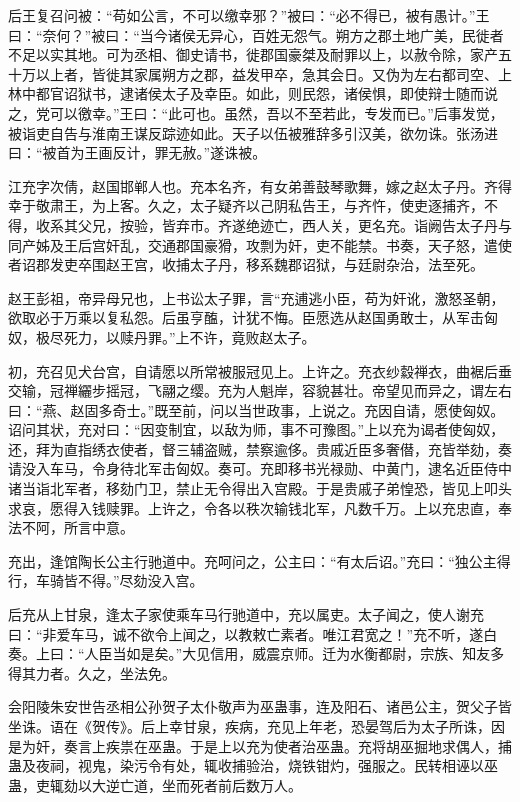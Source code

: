 \documentclass[]{article}
\begin{document}
后王复召问被：``苟如公言，不可以缴幸邪？''被曰：``必不得已，被有愚计。''王曰：``奈何？''被曰：``当今诸侯无异心，百姓无怨气。朔方之郡土地广美，民徙者不足以实其地。可为丞相、御史请书，徙郡国豪桀及耐罪以上，以赦令除，家产五十万以上者，皆徙其家属朔方之郡，益发甲卒，急其会日。又伪为左右都司空、上林中都官诏狱书，逮诸侯太子及幸臣。如此，则民怨，诸侯惧，即使辩士随而说之，党可以徼幸。''王曰：``此可也。虽然，吾以不至若此，专发而已。''后事发觉，被诣吏自告与淮南王谋反踪迹如此。天子以伍被雅辞多引汉美，欲勿诛。张汤进曰：``被首为王画反计，罪无赦。''遂诛被。

江充字次倩，赵国邯郸人也。充本名齐，有女弟善鼓琴歌舞，嫁之赵太子丹。齐得幸于敬肃王，为上客。久之，太子疑齐以己阴私告王，与齐忤，使吏逐捕齐，不得，收系其父兄，按验，皆弃市。齐遂绝迹亡，西人关，更名充。诣阙告太子丹与同产姊及王后宫奸乱，交通郡国豪猾，攻剽为奸，吏不能禁。书奏，天子怒，遣使者诏郡发吏卒围赵王宫，收捕太子丹，移系魏郡诏狱，与廷尉杂治，法至死。

赵王彭祖，帝异母兄也，上书讼太子罪，言``充逋逃小臣，苟为奸讹，激怒圣朝，欲取必于万乘以复私怨。后虽亨醢，计犹不悔。臣愿选从赵国勇敢士，从军击匈奴，极尽死力，以赎丹罪。''上不许，竟败赵太子。

初，充召见犬台宫，自请愿以所常被服冠见上。上许之。充衣纱縠禅衣，曲裾后垂交输，冠禅纚步摇冠，飞翮之缨。充为人魁岸，容貌甚壮。帝望见而异之，谓左右曰：``燕、赵固多奇士。''既至前，问以当世政事，上说之。充因自请，愿使匈奴。诏问其状，充对曰：``因变制宜，以敌为师，事不可豫图。''上以充为谒者使匈奴，还，拜为直指绣衣使者，督三辅盗贼，禁察逾侈。贵戚近臣多奢僣，充皆举劾，奏请没入车马，令身待北军击匈奴。奏可。充即移书光禄勋、中黄门，逮名近臣侍中诸当诣北军者，移劾门卫，禁止无令得出入宫殿。于是贵戚子弟惶恐，皆见上叩头求哀，愿得入钱赎罪。上许之，令各以秩次输钱北军，凡数千万。上以充忠直，奉法不阿，所言中意。

充出，逢馆陶长公主行驰道中。充呵问之，公主曰：``有太后诏。''充曰：``独公主得行，车骑皆不得。''尽劾没入宫。

后充从上甘泉，逢太子家使乘车马行驰道中，充以属吏。太子闻之，使人谢充曰：``非爱车马，诚不欲令上闻之，以教敕亡素者。唯江君宽之！''充不听，遂白奏。上曰：``人臣当如是矣。''大见信用，威震京师。迁为水衡都尉，宗族、知友多得其力者。久之，坐法免。

会阳陵朱安世告丞相公孙贺子太仆敬声为巫蛊事，连及阳石、诸邑公主，贺父子皆坐诛。语在《贺传》。后上幸甘泉，疾病，充见上年老，恐晏驾后为太子所诛，因是为奸，奏言上疾祟在巫蛊。于是上以充为使者治巫蛊。充将胡巫掘地求偶人，捕蛊及夜祠，视鬼，染污令有处，辄收捕验治，烧铁钳灼，强服之。民转相诬以巫蛊，吏辄劾以大逆亡道，坐而死者前后数万人。
\end{document}
